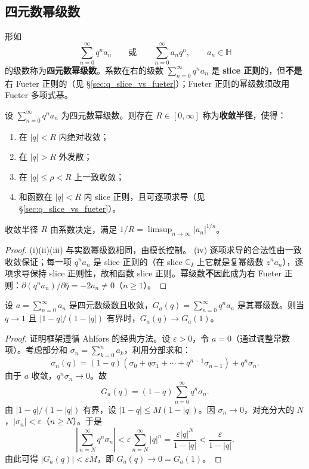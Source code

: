 \subsection{四元数幂级数}

\begin{definition}[四元数幂级数]\label{def:q_power_series}
形如
\[
\sum_{n=0}^\infty q^n a_n \qquad\text{或}\qquad \sum_{n=0}^\infty a_n q^n,\qquad a_n\in\mathbb{H}
\]
的级数称为\textbf{四元数幂级数}。系数在右的级数 $\sum_{n=0}^\infty q^n a_n$ 是 \textbf{slice 正则}的，但\textbf{不是}右 Fueter 正则的（见 \S\ref{sec:q_slice_vs_fueter}）；Fueter 正则的幂级数须改用 Fueter 多项式基。
\end{definition}

\begin{theorem}[四元数幂级数的收敛性]\label{thm:q_power_series_convergence}
设 $\sum_{n=0}^\infty q^n a_n$ 为四元数幂级数。则存在 $R\in[0,\infty]$ 称为\textbf{收敛半径}，使得：
\begin{enumerate}[label=(\roman*)]
    \item 在 $|q|<R$ 内绝对收敛；
    \item 在 $|q|>R$ 外发散；
    \item 在 $|q|\le \rho<R$ 上一致收敛；
    \item 和函数在 $|q|<R$ 内 slice 正则，且可逐项求导（见 \S\ref{sec:q_slice_vs_fueter}）。
\end{enumerate}
收敛半径 $R$ 由系数决定，满足 $1/R=\limsup_{n\to\infty}|a_n|^{1/n}$。
\end{theorem}

\begin{proof}
(i)(ii)(iii) 与实数幂级数相同，由模长控制。 (iv) 逐项求导的合法性由一致收敛保证；每一项 $q^n a_n$ 是 slice 正则的（在 slice $\mathbb{C}_I$ 上它就是复幂级数 $z^n a_n$），逐项求导保持 slice 正则性，故和函数 slice 正则。幂级数\textbf{不}因此成为右 Fueter 正则：$\partial(q^n a_n)/\partial\bar q=-2a_n\neq 0$（$n\ge 1$）。
\end{proof}

\begin{theorem}\label{thm:q_abel}
设 $a=\sum_{n=0}^\infty a_n$ 是四元数级数且收敛，$G_a(q)=\sum_{n=0}^\infty q^n a_n$ 是其幂级数。则当 $q\to 1$ 且 $|1-q|/(1-|q|)$ 有界时，$G_a(q)\to G_a(1)$。
\end{theorem}

\begin{proof}
证明框架遵循 Ahlfors 的经典方法。设 $\varepsilon>0$，令 $a=0$（通过调整常数项）。考虑部分和 $\sigma_n=\sum_{k=0}^n a_k$，利用分部求和：
\[
\sigma_n(q)=(1-q)(\sigma_0+q\sigma_1+\cdots+q^{n-1}\sigma_{n-1})+q^n\sigma_n.
\]
由于 $a$ 收敛，$q^n\sigma_n\to 0$。故
\[
G_a(q)=(1-q)\sum_{n=0}^\infty q^n\sigma_n.
\]
由 $|1-q|/(1-|q|)$ 有界，设 $|1-q|\le M(1-|q|)$。因 $\sigma_n\to 0$，对充分大的 $N$，$|\sigma_n|<\varepsilon$（$n\ge N$）。于是
\[
\left|\sum_{n=N}^\infty q^n\sigma_n\right|<\varepsilon\sum_{n=N}^\infty|q|^n=\frac{\varepsilon|q|^N}{1-|q|}<\frac{\varepsilon}{1-|q|}.
\]
由此可得 $|G_a(q)|<\varepsilon M$，即 $G_a(q)\to 0=G_a(1)$。
\end{proof}

